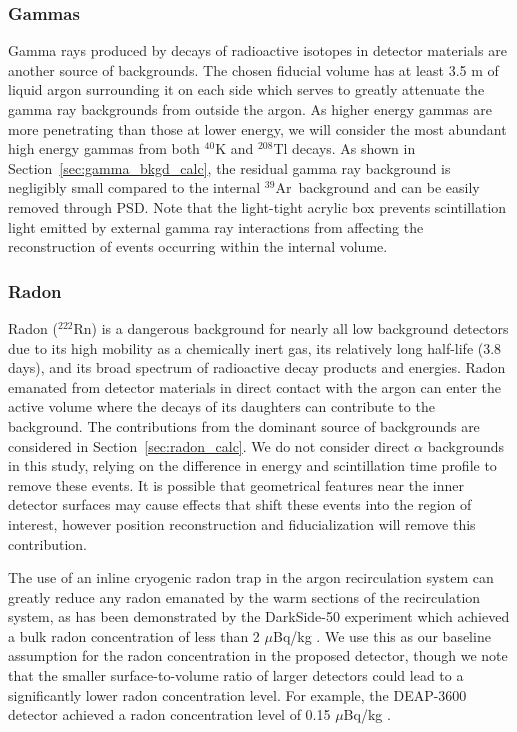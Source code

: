 \documentclass[a4paper,11pt]{article}
\newcommand{\artn}{$^{39}$Ar}
\begin{document}
\subsubsection{Gammas}
Gamma rays produced by decays of radioactive isotopes in detector materials are another source of backgrounds. The chosen fiducial volume has at least 3.5 m of liquid argon surrounding it on each side which serves to greatly attenuate the gamma ray backgrounds from outside the argon. As higher energy gammas are more penetrating than those at lower energy, we will consider the most abundant high energy gammas from both $^{40}$K and $^{208}$Tl decays.  As shown in Section~\ref{sec:gamma_bkgd_calc}, the residual gamma ray background is negligibly small compared to the internal \artn~background and can be easily removed through PSD. Note that the light-tight acrylic box prevents scintillation light emitted by external gamma ray interactions from affecting the reconstruction of events occurring within the internal volume. 


\subsubsection{Radon}
Radon ($^{222}$Rn) is a dangerous background for nearly all low background detectors due to its high mobility as a chemically inert gas, its relatively long half-life (3.8 days), and its broad spectrum of radioactive decay products and energies. Radon emanated from detector materials in direct contact with the argon can enter the active volume where the decays of its daughters can contribute to the background. The contributions from the dominant source of backgrounds are considered in Section~\ref{sec:radon_calc}. We do not consider direct $\alpha$ backgrounds in this study, relying on the difference in energy and scintillation time profile to remove these events. It is possible that geometrical features near the inner detector surfaces may cause effects that shift these events into the region of interest, however position reconstruction and fiducialization will remove this contribution.

The use of an inline cryogenic radon trap in the argon recirculation system can greatly reduce any radon emanated by the warm sections of the recirculation system, as has been demonstrated by the DarkSide-50 experiment \cite{agnes2015first} which achieved a bulk radon concentration of less than 2 $\mu$Bq/kg \cite{DarkSide-20k}. We use this as our baseline assumption for the radon concentration in the proposed detector, though we note that the smaller surface-to-volume ratio of larger detectors could lead to a significantly lower radon concentration level. For example, the DEAP-3600 detector achieved a radon concentration level of 0.15 $\mu$Bq/kg \cite{DEAP-PRD}.
\end{document}
